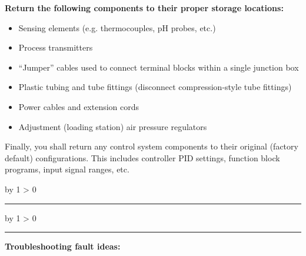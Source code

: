 \documentclass[12pt,a4paper]{article}
\def\svar{
           \advance\answnum by 1
           \ifnum \answnum > 0
                \hrule
                \vskip 3pt
                \leftline{Svar \the\answnum}
                \vskip 3pt \fi}
\def\notes{
           \advance\explnum by 1
           \ifnum \explnum > 0
                \hrule
                \vskip 3pt
                \leftline{Notes \the\explnum}
                \vskip 3pt \fi}
\begin{document}
\vskip 10pt

\indent
{\bf Return the following components to their proper storage locations:}

\begin{itemize}
\item{} Sensing elements (e.g. thermocouples, pH probes, etc.)
\item{} Process transmitters
\item{} ``Jumper'' cables used to connect terminal blocks within a single junction box
\item{} Plastic tubing and tube fittings (disconnect compression-style tube fittings)
\item{} Power cables and extension cords
\item{} Adjustment (loading station) air pressure regulators
\end{itemize}

\vskip 10pt

Finally, you shall return any control system components to their original (factory default) configurations.  This includes controller PID settings, function block programs, input signal ranges, etc.


\vskip 10pt \filbreak 





\svar{} 


\vskip 10pt \filbreak 





\notes{} 

{\bf Troubleshooting fault ideas:}
\end{document}

